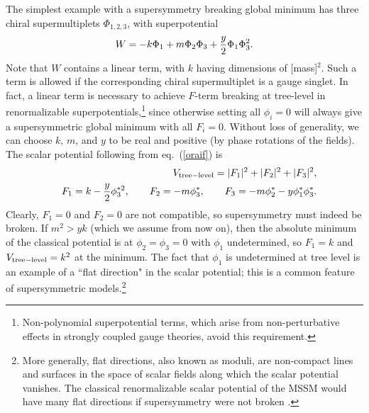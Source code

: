 \documentclass[12pt]{article}
\def\beq{\begin{eqnarray}}
\def\eeq{\end{eqnarray}}
\begin{document}
The simplest example with a supersymmetry breaking 
global minimum has three chiral supermultiplets $\Phi_{1,2,3}$, with superpotential
\beq
W = -k \Phi_1 + m \Phi_2 \Phi_3 + {y\over 2} \Phi_1 \Phi_3^2 .
\label{oraif}
\eeq
Note that $W$ contains a linear term, with $k$ having dimensions of
[mass]$^2$.  Such a term is allowed if the corresponding chiral
supermultiplet is a gauge singlet.  In fact, a linear term is necessary to
achieve $F$-term breaking at tree-level in renormalizable
superpotentials,\footnote{Non-polynomial superpotential terms, which
arise from non-perturbative effects in strongly coupled gauge theories, 
avoid this requirement.} since
otherwise setting all $\phi_i=0$ will always give a supersymmetric global
minimum with all $F_i=0$. Without loss of generality, we can choose $k$,
$m$, and $y$ to be real and positive (by phase rotations of the fields).
The scalar potential following from eq.~(\ref{oraif}) is
\beq
&& V_{\rm tree-level} = |F_1|^2 + |F_2|^2 + |F_3|^2, \\
&& F_1 =
k - {y\over 2} \phi_3^{*2} ,\qquad
F_2 = -m \phi^*_3 ,\qquad
F_3 = -m \phi^*_2 - y \phi^*_1 \phi^*_3 .
\eeq
Clearly, $F_1=0$ and $F_2=0$ are not compatible, so supersymmetry must
indeed be broken. If $m^2 > yk$ (which we assume from now on), then the
absolute minimum of the classical potential is at $\phi_2=\phi_3=0$ with $\phi_1$
undetermined, so $F_1 = k$ and $V_{\rm tree-level}=k^2$ at the minimum. The fact that
$\phi_1$ is undetermined at tree level is an example of a ``flat direction" in the
scalar potential; this is a common feature of supersymmetric
models.\footnote{More generally, flat directions, also known as moduli, are non-compact lines
and surfaces in the space of scalar fields along which the scalar
potential vanishes. The classical renormalizable scalar potential of the MSSM would have
many flat directions if supersymmetry were not broken 
\cite{flatdirections}.}
\end{document}

